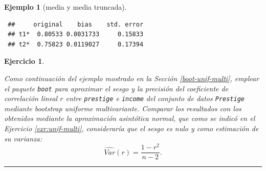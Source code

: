 \documentclass[
  spanish,
  10pt,
]{book}
\newenvironment{Shaded}{\begin{snugshade}}{\end{snugshade}}
\newcommand{\AttributeTok}[1]{\textcolor[rgb]{0.13,0.29,0.53}{#1}}
\newcommand{\ConstantTok}[1]{\textcolor[rgb]{0.56,0.35,0.01}{#1}}
\newcommand{\DecValTok}[1]{\textcolor[rgb]{0.00,0.00,0.81}{#1}}
\newcommand{\FunctionTok}[1]{\textcolor[rgb]{0.13,0.29,0.53}{\textbf{#1}}}
\newcommand{\NormalTok}[1]{#1}
\newcommand{\OtherTok}[1]{\textcolor[rgb]{0.56,0.35,0.01}{#1}}
\newcommand{\SpecialCharTok}[1]{\textcolor[rgb]{0.81,0.36,0.00}{\textbf{#1}}}
\newcommand{\StringTok}[1]{\textcolor[rgb]{0.31,0.60,0.02}{#1}}
\theoremstyle{break}
\newtheorem{exercise}{Ejercicio}[chapter]
\newtheorem{example}{Ejemplo}[chapter]
\theoremstyle{nonumberplain}
\begin{document}
\begin{example}[media y media truncada]
\begin{Shaded}
\end{Shaded}

\begin{verbatim}
 ##     original    bias    std. error
 ## t1*  0.80533 0.0031733     0.15833
 ## t2*  0.75823 0.0119027     0.17394
\end{verbatim}

\end{example}

\begin{exercise}
\protect\hypertarget{exr:unif-multi-sesgo-var}{}\label{exr:unif-multi-sesgo-var}

Como continuación del ejemplo mostrado en la Sección \ref{boot-unif-multi}, emplear el paquete \texttt{boot} para aproximar el sesgo y la precisión del coeficiente de correlación lineal \(r\) entre \texttt{prestige} e \texttt{income} del conjunto de datos \texttt{Prestige} mediante bootstrap uniforme multivariante.
Comparar los resultados con los obtenidos mediante la aproximación asintótica normal, que como se indicó en el Ejercicio \ref{exr:unif-multi}, consideraría que el sesgo es nulo y como estimación de su varianza:
\[\widehat{Var}(r) = \frac{1 - r^2}{n - 2}.\]
\end{exercise}

\begin{center}\rule{0.5\linewidth}{0.5pt}\end{center}
\end{document}
